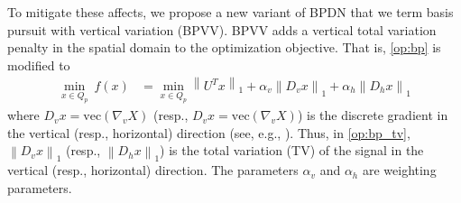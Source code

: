 \documentclass[twocolumn,oneside]{IEEEtran/IEEEtran}
\begin{document}
To mitigate these affects, we propose a new variant of BPDN that we term basis pursuit with
vertical variation (BPVV). BPVV adds a vertical total variation penalty in the spatial domain to the
optimization objective. That is, \eqref{op:bp} is modified to
\begin{align}
  \min_{x\in Q_p}~f(x) &= \min_{x\in Q_p} \left\|U^Tx\right\|_1 + \alpha_v\left\|D_vx\right\|_1
                         + \alpha_h\left\|D_hx\right\|_1  \label{op:bp_tv}
\end{align}
where ${D_v x=\text{vec}(\nabla_v X)}$ (resp., ${D_v x=\text{vec}(\nabla_v X)}$) is the
discrete gradient in the vertical (resp., horizontal) direction (see, e.g., \cite[Section 6.1,]{becker_nesta_2011}). 
Thus, in \eqref{op:bp_tv}, $\left \| D_v x \right \|_1$ (resp., $\left \| D_h x \right \|_1$) is the total variation (TV) of the signal in the vertical (resp., horizontal) direction. The parameters $\alpha_v$ and $\alpha_h$ are weighting parameters.
\end{document}
